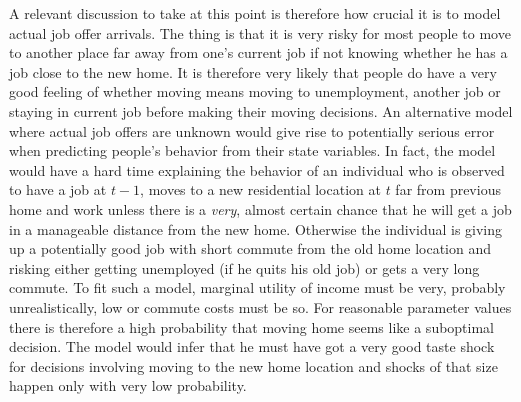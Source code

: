 A relevant discussion to take at this point is therefore how crucial it is to model actual job offer arrivals. The thing is that it is very risky for most people to move to another place far away from one's current job if not knowing whether he has a job close to the new home. It is therefore very likely that people do have a very good feeling of whether moving means moving to unemployment, another job or staying in current job before making their moving decisions. An alternative model where actual job offers are unknown would give rise to potentially serious error when predicting people's behavior from their state variables. In fact, the model would have a hard time explaining the behavior of an individual who is observed to have a job at $t-1$, moves to a new residential location at $t$ far from previous home and work unless there is a \textit{very}, almost certain chance that he will get a job in a manageable distance from the new home. Otherwise the individual is giving up a potentially good job with short commute from the old home location and risking either getting unemployed (if he quits his old job) or gets a very long commute. To fit such a model, marginal utility of income must be very, probably unrealistically, low or commute costs must be so. For reasonable parameter values there is therefore a high probability that moving home seems like a suboptimal decision. The model would infer that he must have got a very good taste shock for decisions involving moving to the new home location and shocks of that size happen only with very low probability. 

